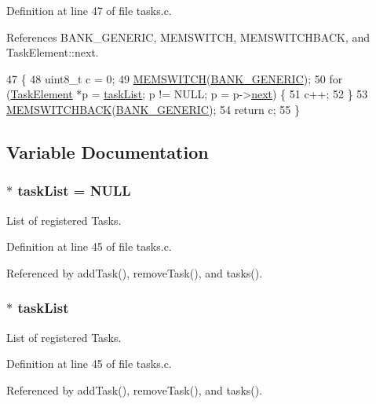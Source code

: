 Definition at line 47 of file tasks.\-c.



References B\-A\-N\-K\-\_\-\-G\-E\-N\-E\-R\-I\-C, M\-E\-M\-S\-W\-I\-T\-C\-H, M\-E\-M\-S\-W\-I\-T\-C\-H\-B\-A\-C\-K, and Task\-Element\-::next.


\begin{DoxyCode}
47                               \{
48     uint8\_t c = 0;
49     \hyperlink{group__xmem_ga253830e5022f2aa99177acd8a0ba0bfe}{MEMSWITCH}(\hyperlink{group__xmem_ga6b1167d0078b33af8ec17ededaebe0cb}{BANK\_GENERIC});
50     \textcolor{keywordflow}{for} (\hyperlink{struct_task_element}{TaskElement} *p = \hyperlink{group__task_gaadf0c3981f1a6c7cc610de145a1d5461}{taskList}; p != NULL; p = p->\hyperlink{struct_task_element_ac0faa835255f5aba0bdb6fe9083d9d7d}{next}) \{
51         c++;
52     \}
53     \hyperlink{group__xmem_ga96199c8c5e6fbc65dd60aa67de63fd34}{MEMSWITCHBACK}(\hyperlink{group__xmem_ga6b1167d0078b33af8ec17ededaebe0cb}{BANK\_GENERIC});
54     \textcolor{keywordflow}{return} c;
55 \}
\end{DoxyCode}


\subsection{Variable Documentation}
\hypertarget{group__task_gaadf0c3981f1a6c7cc610de145a1d5461}{
\subsubsection[{task\-List}]{$\ast$ task\-List = N\-U\-L\-L}}\label{group__task_gaadf0c3981f1a6c7cc610de145a1d5461}


List of registered Tasks. 



Definition at line 45 of file tasks.\-c.



Referenced by add\-Task(), remove\-Task(), and tasks().

\hypertarget{group__task_gaadf0c3981f1a6c7cc610de145a1d5461}{
\subsubsection[{task\-List}]{$\ast$ task\-List}}\label{group__task_gaadf0c3981f1a6c7cc610de145a1d5461}


List of registered Tasks. 



Definition at line 45 of file tasks.\-c.



Referenced by add\-Task(), remove\-Task(), and tasks().

